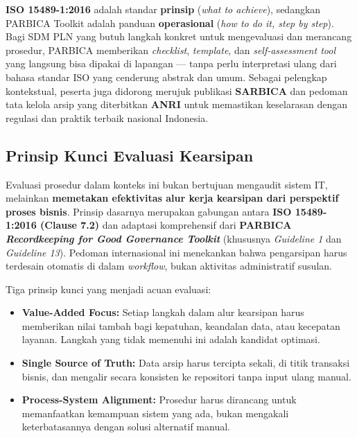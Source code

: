 \documentclass[12pt,a4paper]{report}
\begin{document}
\begin{plnbox}
\small
\textbf{ISO 15489-1:2016} adalah standar \textbf{prinsip} (\textit{what to achieve}), sedangkan PARBICA Toolkit adalah panduan \textbf{operasional} (\textit{how to do it, step by step}). Bagi SDM PLN yang butuh langkah konkret untuk mengevaluasi dan merancang prosedur, PARBICA memberikan \textit{checklist}, \textit{template}, dan \textit{self-assessment tool} yang langsung bisa dipakai di lapangan --- tanpa perlu interpretasi ulang dari bahasa standar ISO yang cenderung abstrak dan umum. Sebagai pelengkap kontekstual, peserta juga didorong merujuk publikasi \textbf{SARBICA} dan pedoman tata kelola arsip yang diterbitkan \textbf{ANRI} untuk memastikan keselarasan dengan regulasi dan praktik terbaik nasional Indonesia.
\end{plnbox}

\subsection{Prinsip Kunci Evaluasi Kearsipan}
Evaluasi prosedur dalam konteks ini bukan bertujuan mengaudit sistem IT, melainkan \textbf{memetakan efektivitas alur kerja kearsipan dari perspektif proses bisnis}. Prinsip dasarnya merupakan gabungan antara \textbf{ISO 15489-1:2016 (Clause 7.2)} dan adaptasi komprehensif dari \textbf{PARBICA \textit{Recordkeeping for Good Governance Toolkit}} (khususnya \textit{Guideline 1} dan \textit{Guideline 13}). Pedoman internasional ini menekankan bahwa pengarsipan harus terdesain otomatis di dalam \textit{workflow}, bukan aktivitas administratif susulan.

Tiga prinsip kunci yang menjadi acuan evaluasi:
\begin{itemize}[leftmargin=*]
    \item \textbf{Value-Added Focus:} Setiap langkah dalam alur kearsipan harus memberikan nilai tambah bagi kepatuhan, keandalan data, atau kecepatan layanan. Langkah yang tidak memenuhi ini adalah kandidat optimasi.
    \item \textbf{Single Source of Truth:} Data arsip harus tercipta sekali, di titik transaksi bisnis, dan mengalir secara konsisten ke repositori tanpa input ulang manual.
    \item \textbf{Process-System Alignment:} Prosedur harus dirancang untuk memanfaatkan kemampuan sistem yang ada, bukan mengakali keterbatasannya dengan solusi alternatif manual.
\end{itemize}
\end{document}

